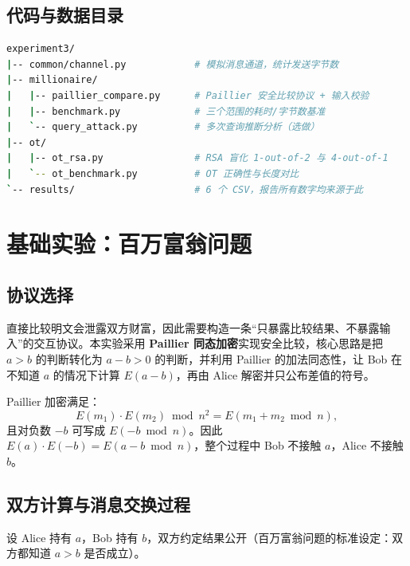 \documentclass{SYSUReport}
\begin{document}
\subsection{代码与数据目录}

\begin{lstlisting}[language=bash, caption={实验三代码与数据目录}]
experiment3/
|-- common/channel.py            # 模拟消息通道，统计发送字节数
|-- millionaire/
|   |-- paillier_compare.py      # Paillier 安全比较协议 + 输入校验
|   |-- benchmark.py             # 三个范围的耗时/字节数基准
|   `-- query_attack.py          # 多次查询推断分析（选做）
|-- ot/
|   |-- ot_rsa.py                # RSA 盲化 1-out-of-2 与 4-out-of-1
|   `-- ot_benchmark.py          # OT 正确性与长度对比
`-- results/                     # 6 个 CSV，报告所有数字均来源于此
\end{lstlisting}

\section{基础实验：百万富翁问题}

\subsection{协议选择}

直接比较明文会泄露双方财富，因此需要构造一条“只暴露比较结果、不暴露输入”的交互协议。本实验采用 \textbf{Paillier 同态加密}实现安全比较，核心思路是把 $a>b$ 的判断转化为 $a-b>0$ 的判断，并利用 Paillier 的加法同态性，让 Bob 在不知道 $a$ 的情况下计算 $E(a-b)$，再由 Alice 解密并只公布差值的符号。

Paillier 加密满足：
\begin{equation}
E(m_1)\cdot E(m_2)\bmod n^2 = E(m_1+m_2\bmod n),
\end{equation}
且对负数 $-b$ 可写成 $E(-b\bmod n)$。因此 $E(a)\cdot E(-b)=E(a-b\bmod n)$，整个过程中 Bob 不接触 $a$，Alice 不接触 $b$。

\subsection{双方计算与消息交换过程}

设 Alice 持有 $a$，Bob 持有 $b$，双方约定结果公开（百万富翁问题的标准设定：双方都知道 $a>b$ 是否成立）。

\begin{center}
\end{center}
\end{document}
